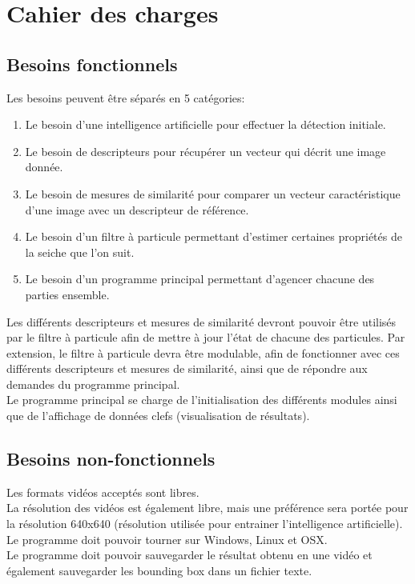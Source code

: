 




\section{Cahier des charges}

\subsection{Besoins fonctionnels}
Les besoins peuvent être séparés en 5 catégories:
\begin{enumerate}
	\item Le besoin d'une intelligence artificielle pour effectuer la détection initiale.
	\item Le besoin de descripteurs pour récupérer un vecteur qui décrit une image donnée.
	\item Le besoin de mesures de similarité pour comparer un vecteur caractéristique d'une image avec un descripteur de référence.
	\item Le besoin d'un filtre à particule permettant d'estimer certaines propriétés de la seiche que l'on suit.
	\item Le besoin d'un programme principal permettant d'agencer chacune des parties ensemble.\\
\end{enumerate}

Les différents descripteurs et mesures de similarité devront pouvoir être utilisés par le filtre à particule afin de mettre à jour l'état de chacune des particules. Par extension, le filtre à particule devra être modulable, afin de fonctionner avec ces différents descripteurs et mesures de similarité, ainsi que de répondre aux demandes du programme principal.\\
Le programme principal se charge de l'initialisation des différents modules ainsi que de l'affichage de données clefs (visualisation de  résultats).\\

\subsection{Besoins non-fonctionnels}
Les formats vidéos acceptés sont libres.\\
La résolution des vidéos est également libre, mais une préférence sera portée pour la résolution 640x640 (résolution utilisée pour entrainer l'intelligence artificielle).\\
Le programme doit pouvoir tourner sur Windows, Linux et OSX.\\
Le programme doit pouvoir sauvegarder le résultat obtenu en une vidéo et également sauvegarder les bounding box dans un fichier texte.\\

